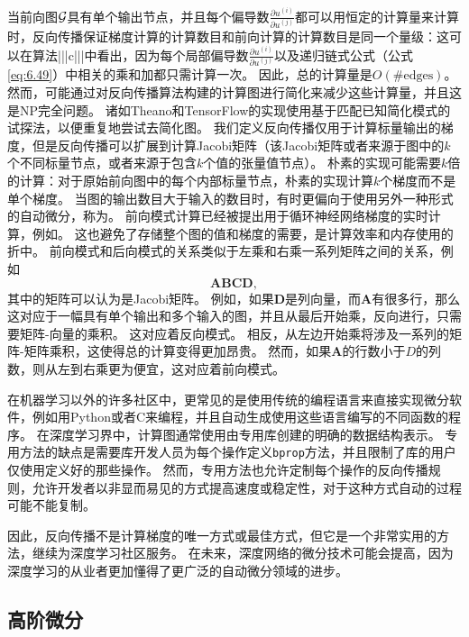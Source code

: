 当前向图$\mathcal{G}$具有单个输出节点，并且每个偏导数$\frac{\partial u^{(i)}}{\partial u^{(j)}}$都可以用恒定的计算量来计算时，反向传播保证梯度计算的计算数目和前向计算的计算数目是同一个量级：这可以在算法|||c|||中看出，因为每个局部偏导数$\frac{\partial u^{(i)}}{\partial u^{(j)}}$以及递归链式公式（公式\ref{eq:6.49}）中相关的乘和加都只需计算一次。
因此，总的计算量是$O(\#\text{edges})$。
然而，可能通过对反向传播算法构建的计算图进行简化来减少这些计算量，并且这是NP完全问题。
诸如Theano和TensorFlow的实现使用基于匹配已知简化模式的试探法，以便重复地尝试去简化图。
我们定义反向传播仅用于计算标量输出的梯度，但是反向传播可以扩展到计算Jacobi矩阵（该Jacobi矩阵或者来源于图中的$k$个不同标量节点，或者来源于包含$k$个值的张量值节点）。
朴素的实现可能需要$k$倍的计算：对于原始前向图中的每个内部标量节点，朴素的实现计算$k$个梯度而不是单个梯度。
当图的输出数目大于输入的数目时，有时更偏向于使用另外一种形式的自动微分，称为。
前向模式计算已经被提出用于循环神经网络梯度的实时计算，例如\citep{Williams89b}。
这也避免了存储整个图的值和梯度的需要，是计算效率和内存使用的折中。
前向模式和后向模式的关系类似于左乘和右乘一系列矩阵之间的关系，例如
\begin{equation}
  \bm{ABCD},
\end{equation}
其中的矩阵可以认为是Jacobi矩阵。
例如，如果$\bm{D}$是列向量，而$\bm{A}$有很多行，那么这对应于一幅具有单个输出和多个输入的图，并且从最后开始乘，反向进行，只需要矩阵-向量的乘积。
这对应着反向模式。
相反，从左边开始乘将涉及一系列的矩阵-矩阵乘积，这使得总的计算变得更加昂贵。
然而，如果$\bm{A}$的行数小于$D$的列数，则从左到右乘更为便宜，这对应着前向模式。

在机器学习以外的许多社区中，更常见的是使用传统的编程语言来直接实现微分软件，例如用Python或者C来编程，并且自动生成使用这些语言编写的不同函数的程序。
在深度学习界中，计算图通常使用由专用库创建的明确的数据结构表示。
专用方法的缺点是需要库开发人员为每个操作定义\verb|bprop|方法，并且限制了库的用户仅使用定义好的那些操作。
然而，专用方法也允许定制每个操作的反向传播规则，允许开发者以非显而易见的方式提高速度或稳定性，对于这种方式自动的过程可能不能复制。

因此，反向传播不是计算梯度的唯一方式或最佳方式，但它是一个非常实用的方法，继续为深度学习社区服务。 
在未来，深度网络的微分技术可能会提高，因为深度学习的从业者更加懂得了更广泛的自动微分领域的进步。
  
  
\subsection{高阶微分}
\label{sec:higher_order_derivatives}

